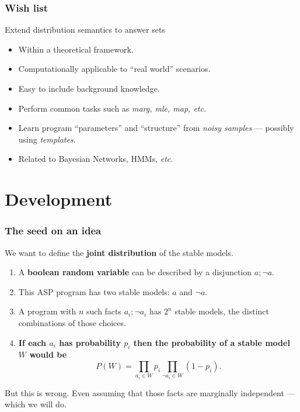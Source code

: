 \documentclass[bigger]{beamer}
\begin{document}
    \begin{frame}
        \frametitle{ Wish list}

        \begin{block}{Extend distribution semantics to answer sets}
            \begin{itemize}
                \item Within a theoretical framework.
                \item Computationally applicable to ``real world'' scenarios.
                \item Easy to include background knowledge.
                \item Perform common tasks such as \emph{marg, mle, map, etc.}
                \item Learn program ``parameters'' and ``structure'' from \emph{noisy samples} --- possibly using \emph{templates}.
                \item Related to Bayesian Networks, HMMs, \emph{etc.}  
            \end{itemize}    
            
        \end{block}
    \end{frame}
    
    \section{Development}
    
    \begin{frame}
        \tableofcontents[currentsection]
    \end{frame}

    \begin{frame}
        \frametitle{The seed on an idea}
        We want to define the \textbf{joint distribution} of the stable models.
        \begin{enumerate} 
            \item A \textbf{boolean random variable} can be described by a disjunction $a; \neg a$.
            \item This ASP program has two stable models: $a$ and $\neg a$.
            \item A program with $n$ such facts $a_i; \neg a_i$ has $2^n$ stable models, the distinct combinations of those choices. 
            \item \textbf{If each $a_i$ has probability $p_i$ then the probability of a stable model $W$ would be} $$P(W) = \prod_{a_i \in W}p_i \prod_{\neg a_i \in W} (1 - p_i).$$            
        \end{enumerate}        
        \pause
        \begin{alertblock}{But this is wrong.}
            Even assuming that those facts are marginally independent --- which we will do.
        \end{alertblock}
    \end{frame}
\end{document}
